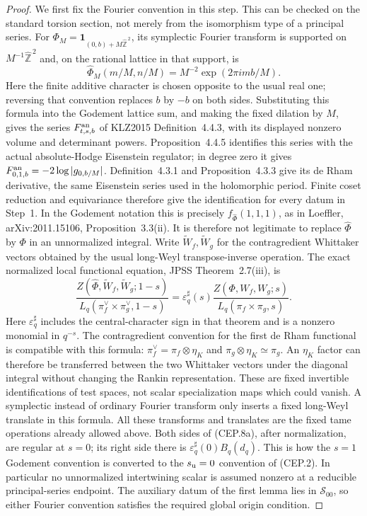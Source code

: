 \begin{proof}
We first fix the Fourier convention in this step.
This can be checked on the standard torsion section,
not merely from the isomorphism type of a principal
series.  For
$\Phi_M=\mathbf1_{(0,b)+M\widehat{\mathbb Z}^{\,2}}$,
its symplectic Fourier transform is supported on
$M^{-1}\widehat{\mathbb Z}^{\,2}$ and, on the
rational lattice in that support, is
\[
 \widehat\Phi_M(m/M,n/M)
          =M^{-2}\exp(2\pi i m b/M).
\]
Here the finite additive character is chosen opposite
to the usual real one; reversing that convention
replaces $b$ by $-b$ on both sides.
Substituting this formula into the Godement lattice
sum, and making the fixed dilation by $M$, gives
the series
$F^{\rm an}_{t,s,b}$ of KLZ2015
Definition~4.4.3, with its displayed nonzero volume
and determinant powers.
Proposition~4.4.5 identifies this series with the
actual absolute-Hodge Eisenstein regulator; in
degree zero it gives
$F^{\rm an}_{0,1,b}=-2\log|g_{0,b/M}|$.
Definition~4.3.1 and Proposition~4.3.3 give its
de Rham derivative, the same Eisenstein series
used in the holomorphic period.
Finite coset reduction and equivariance therefore
give the identification for every datum in Step~1.
In the Godement notation this is precisely
$f_{\widehat\Phi}(1,1,1)$, as in Loeffler,
arXiv:2011.15106, Proposition~3.3(ii).
It is therefore not legitimate to replace
$\widehat\Phi$ by $\Phi$ in an unnormalized integral.
Write $\widetilde W_f,\widetilde W_g$ for the
contragredient Whittaker vectors obtained by the
usual long-Weyl transpose-inverse operation.
The exact normalized local functional equation,
JPSS Theorem~2.7(iii), is
\[
 \frac{Z(\widehat\Phi,\widetilde W_f,\widetilde W_g;1-s)}
      {L_q(\pi_f^\vee\times\pi_g^\vee,1-s)}
  =\varepsilon_q^\sharp(s)
       \frac{Z(\Phi,W_f,W_g;s)}
            {L_q(\pi_f\times\pi_g,s)} .
                                                        \tag{CEP.8a}
\]
Here $\varepsilon_q^\sharp$ includes the
central-character sign in that theorem and is a
nonzero monomial in $q^{-s}$.
The contragredient convention for the first
de Rham functional is compatible with this formula:
$\pi_f^\vee=\pi_f\otimes\eta_K$ and
$\pi_g\otimes\eta_K\simeq\pi_g$.
An $\eta_K$ factor can therefore be transferred
between the two Whittaker vectors under the
diagonal integral without changing the Rankin
representation.  These are fixed invertible
identifications of test spaces, not scalar
specialization maps which could vanish.
A symplectic instead of ordinary Fourier transform
only inserts a fixed long-Weyl translate in this
formula.  All these transforms and translates are
the fixed tame operations already allowed above.
Both sides of (CEP.8a), after normalization, are
regular at $s=0$; its right side there is
$\varepsilon_q^\sharp(0)B_q(d_q)$.
This is how the $s=1$ Godement convention is
converted to the $s_{\rm u}=0$ convention of
(CEP.2).  In particular no unnormalized
intertwining scalar is assumed nonzero at a
reducible principal-series endpoint.
The auxiliary datum of the first lemma lies in
$\mathcal S_{00}$, so either Fourier convention
satisfies the required global origin condition.


\end{proof}
